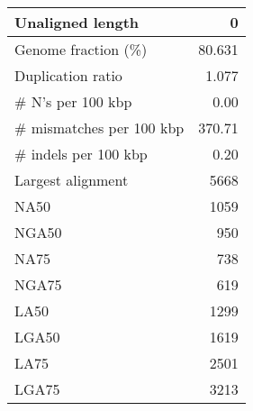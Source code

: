 \documentclass[12pt,a4paper]{article}
\begin{document}
\begin{table}[ht]
\begin{center}
\begin{tabular}{|l*{1}{|r}|}
Unaligned length & 0 \\ \hline
Genome fraction (\%) & 80.631 \\ \hline
Duplication ratio & 1.077 \\ \hline
\# N's per 100 kbp & 0.00 \\ \hline
\# mismatches per 100 kbp & 370.71 \\ \hline
\# indels per 100 kbp & 0.20 \\ \hline
Largest alignment & 5668 \\ \hline
NA50 & 1059 \\ \hline
NGA50 & 950 \\ \hline
NA75 & 738 \\ \hline
NGA75 & 619 \\ \hline
LA50 & 1299 \\ \hline
LGA50 & 1619 \\ \hline
LA75 & 2501 \\ \hline
LGA75 & 3213 \\ \hline
\end{tabular}
\end{center}
\end{table}
\end{document}
